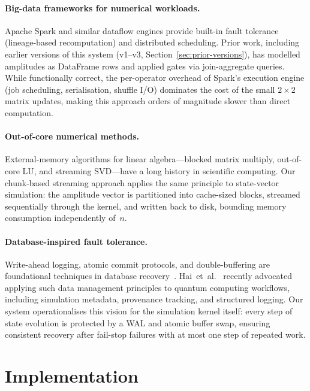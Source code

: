\paragraph{Big-data frameworks for numerical workloads.}
Apache Spark and similar dataflow engines provide built-in fault
tolerance (lineage-based recomputation) and distributed scheduling.
Prior work, including earlier versions of this system (v1--v3,
Section~\ref{sec:prior-versions}), has modelled amplitudes as
DataFrame rows and applied gates via join-aggregate queries.
While functionally correct, the per-operator overhead of Spark's
execution engine (job scheduling, serialisation, shuffle I/O)
dominates the cost of the small $2\!\times\!2$ matrix updates,
making this approach orders of magnitude slower than direct
computation.

\paragraph{Out-of-core numerical methods.}
External-memory algorithms for linear algebra---blocked matrix
multiply, out-of-core LU, and streaming SVD---have a long history
in scientific computing. Our chunk-based streaming approach applies
the same principle to state-vector simulation: the amplitude vector
is partitioned into cache-sized blocks, streamed sequentially
through the kernel, and written back to disk, bounding memory
consumption independently of~$n$.

\paragraph{Database-inspired fault tolerance.}
Write-ahead logging, atomic commit protocols, and double-buffering
are foundational techniques in database recovery~\cite{mohan1992aries}.
Hai~et~al.~\cite{hai2025cqms} recently advocated applying such
data management principles to quantum computing workflows, including
simulation metadata, provenance tracking, and structured logging.
Our system operationalises this vision for the simulation kernel
itself: every step of state evolution is protected by a WAL and
atomic buffer swap, ensuring consistent recovery after fail-stop
failures with at most one step of repeated work.



\section{Implementation}
\label{sec:implementation}

